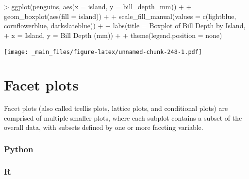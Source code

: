 \documentclass[
]{book}
\newenvironment{Shaded}{\begin{snugshade}}{\end{snugshade}}
\newcommand{\AttributeTok}[1]{\textcolor[rgb]{0.77,0.63,0.00}{#1}}
\newcommand{\FunctionTok}[1]{\textcolor[rgb]{0.00,0.00,0.00}{#1}}
\newcommand{\NormalTok}[1]{#1}
\newcommand{\SpecialCharTok}[1]{\textcolor[rgb]{0.00,0.00,0.00}{#1}}
\newcommand{\StringTok}[1]{\textcolor[rgb]{0.31,0.60,0.02}{#1}}
\begin{document}
\begin{Shaded}
\begin{Highlighting}[]
\SpecialCharTok{\textgreater{}} \FunctionTok{ggplot}\NormalTok{(penguins, }\FunctionTok{aes}\NormalTok{(}\AttributeTok{x =}\NormalTok{ island, }\AttributeTok{y =}\NormalTok{ bill\_depth\_mm)) }\SpecialCharTok{+}
\SpecialCharTok{+}   \FunctionTok{geom\_boxplot}\NormalTok{(}\FunctionTok{aes}\NormalTok{(}\AttributeTok{fill =}\NormalTok{ island)) }\SpecialCharTok{+}
\SpecialCharTok{+}   \FunctionTok{scale\_fill\_manual}\NormalTok{(}\AttributeTok{values =} \FunctionTok{c}\NormalTok{(}\StringTok{\textquotesingle{}lightblue\textquotesingle{}}\NormalTok{, }\StringTok{\textquotesingle{}cornflowerblue\textquotesingle{}}\NormalTok{, }\StringTok{\textquotesingle{}darkslateblue\textquotesingle{}}\NormalTok{)) }\SpecialCharTok{+}
\SpecialCharTok{+}   \FunctionTok{labs}\NormalTok{(}\AttributeTok{title =} \StringTok{\textquotesingle{}Boxplot of Bill Depth by Island\textquotesingle{}}\NormalTok{, }
\SpecialCharTok{+}        \AttributeTok{x =} \StringTok{\textquotesingle{}Island\textquotesingle{}}\NormalTok{, }\AttributeTok{y =} \StringTok{\textquotesingle{}Bill Depth (mm)\textquotesingle{}}\NormalTok{) }\SpecialCharTok{+}
\SpecialCharTok{+}   \FunctionTok{theme}\NormalTok{(}\AttributeTok{legend.position =} \StringTok{\textquotesingle{}none\textquotesingle{}}\NormalTok{)}
\end{Highlighting}
\end{Shaded}

\texttt{[image: \_main\_files/figure-latex/unnamed-chunk-248-1.pdf]}

\hypertarget{facet-plots}{%
\section{Facet plots}\label{facet-plots}}

Facet plots (also called trellis plots, lattice plots, and conditional plots) are comprised of multiple smaller plots, where each subplot contains a subset of the overall data, with subsets defined by one or more faceting variable.

\hypertarget{python-44}{%
\subsubsection*{Python}\label{python-44}}

\hypertarget{r-44}{%
\subsubsection*{R}\label{r-44}}
\end{document}
